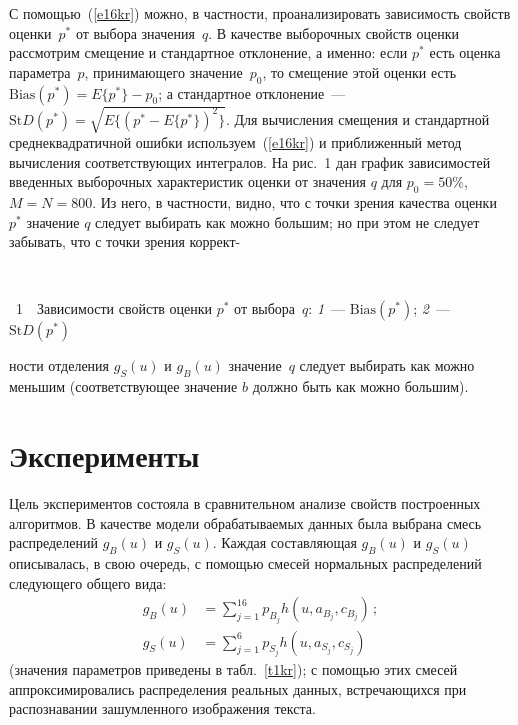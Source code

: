 \begin{multicols}{2}
    
С помощью~(\ref{e16kr}) можно, в частности, проанализировать 
зависимость свойств оценки~$p^*$ от выбора значения~$q$. В качестве 
выборочных свойств оценки рассмотрим смещение и стандартное отклонение, а 
именно: если $p^*$ есть оценка параметра~$p$, принимающего значение~$p_0$, 
то смещение этой оценки есть $\mathrm{Bias} (p^*) = E\{p^*\} -p_0$; а стандартное 
отклонение~--- $\mathrm{St}D (p^*) =\sqrt{E\{(p^*-E\{p^*\})^2\}}$. Для вычисления 
смещения и стандартной среднеквадратичной ошибки 
используем~(\ref{e16kr}) и приближенный метод вычисления 
соответствующих интегралов. На рис.~1 дан график зависимостей 
введенных выборочных характеристик оценки от значения $q$ для $p_0 = 50\%$, 
$M = N = 800$. Из него, в частности, видно, что с точки зрения качества оценки $p^*$
значение $q$ следует выбирать как можно большим;
но при этом не следует забывать, что с точки зрения коррект-\linebreak\vspace*{-12pt} 

\begin{center}
\vspace*{2pt}
\mbox{%
\epsfxsize=76.433mm
}
\end{center}
\vspace*{1pt}
{{\figurename~1}\ \ \small{Зависимости свойств оценки $p^*$ от выбора~$q$: \textit{1}~--- 
$\mathrm{Bias} (p^*)$; \textit{2}~--- $\mathrm{St}D(p^*)$}}
\bigskip
\addtocounter{figure}{1}  

\noindent
ности отделения $g_S(u)$ и $g_B(u)$ 
значение~$q$ следует выбирать как можно меньшим (соответствующее значение 
$b$ должно быть как можно большим).

\section{Эксперименты}

Цель экспериментов состояла в сравнительном анализе свойств 
построенных алгоритмов. В качестве модели обрабатываемых данных была 
выбрана смесь распределений $g_B(u)$ и $g_S(u)$. Каждая со\-став\-ля\-ющая 
$g_B(u)$ и $g_S(u)$ описывалась, в свою очередь, с помощью смесей нормальных 
распределений следующего общего вида: 
     \begin{align*}
     g_B(u) & = \sum\limits_{j=1}^{16} p_{B_j}h\left(u,a_{B_j},c_{B_j}\right)\,;\\
     g_S(u) & = \sum\limits_{j=1}^6 p_{S_j} h\left(u, a_{S_j}, c_{S_j}\right)
     \end{align*}
     (значения параметров приведены в табл.~\ref{t1kr}); с по\-мощью этих 
смесей аппроксимировались распределения реальных данных, встречающихся 
при распознавании зашумленного изображения текста. 


\end{multicols}
